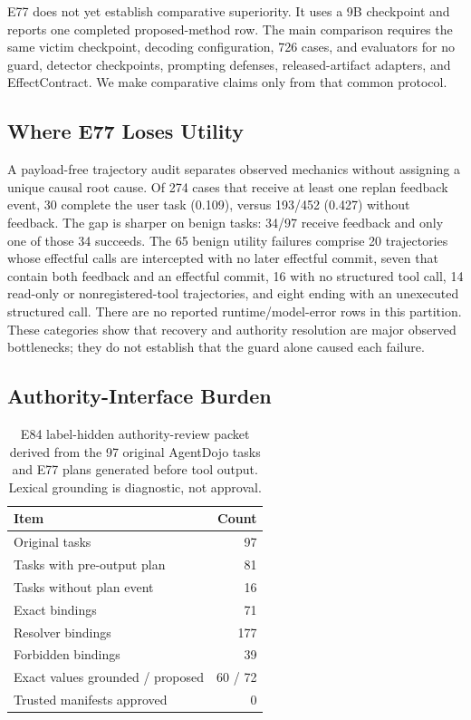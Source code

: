 \documentclass[letterpaper,twocolumn,10pt]{article}
\newcommand{\sys}{EffectContract}
\begin{document}
E77 does not yet establish comparative superiority. It uses a 9B checkpoint and reports one completed proposed-method row. The main comparison requires the same victim checkpoint, decoding configuration, 726 cases, and evaluators for no guard, detector checkpoints, prompting defenses, released-artifact adapters, and \sys{}. We make comparative claims only from that common protocol.

\subsection{Where E77 Loses Utility}

A payload-free trajectory audit separates observed mechanics without assigning a unique causal root cause. Of 274 cases that receive at least one replan feedback event, 30 complete the user task (0.109), versus 193/452 (0.427) without feedback. The gap is sharper on benign tasks: 34/97 receive feedback and only one of those 34 succeeds. The 65 benign utility failures comprise 20 trajectories whose effectful calls are intercepted with no later effectful commit, seven that contain both feedback and an effectful commit, 16 with no structured tool call, 14 read-only or nonregistered-tool trajectories, and eight ending with an unexecuted structured call. There are no reported runtime/model-error rows in this partition. These categories show that recovery and authority resolution are major observed bottlenecks; they do not establish that the guard alone caused each failure.

\subsection{Authority-Interface Burden}

\begin{table}[t]
\centering
\small
\caption{E84 label-hidden authority-review packet derived from the 97 original AgentDojo tasks and E77 plans generated before tool output. Lexical grounding is diagnostic, not approval.}
\label{tab:e84-authority-burden}
\begin{tabular}{@{}lr@{}}
\toprule
Item & Count \\
\midrule
Original tasks & 97 \\
Tasks with pre-output plan & 81 \\
Tasks without plan event & 16 \\
Exact bindings & 71 \\
Resolver bindings & 177 \\
Forbidden bindings & 39 \\
Exact values grounded / proposed & 60 / 72 \\
Trusted manifests approved & 0 \\
\bottomrule
\end{tabular}
\end{table}
 
\end{document}
